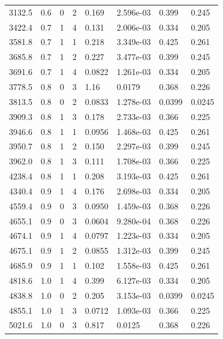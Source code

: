 \documentclass[preview]{standalone}
\begin{document}
{{{\begin{tabular}{L{1.2cm}C{1.2cm} C{0.3cm}C{0.5cm} C{1.4cm}C{1.4cm} C{1.4cm}C{1.4cm}}
  3132.5  &   0.6  & 0     &  2 &  0.169  & 2.596e-03  & 0.399 &  0.245   \\ 
  3422.4  &   0.7  & 1     &  4 &  0.131  & 2.006e-03  & 0.334 &  0.205   \\ 
  3581.8  &   0.7  & 1     &  1 &  0.218  & 3.349e-03  & 0.425 &  0.261   \\ 
  3685.8  &   0.7  & 1     &  2 &  0.227  & 3.477e-03  & 0.399 &  0.245   \\ 
  3691.6  &   0.7  & 1     &  4 &  0.0822  & 1.261e-03  & 0.334 &  0.205   \\ 
  3778.5  &   0.8  & 0     &  3 &  1.16  & 0.0179  & 0.368 &  0.226   \\ 
  3813.5  &   0.8  & 0     &  2 &  0.0833  & 1.278e-03  & 0.0399 &  0.0245   \\ 
  3909.3  &   0.8  & 1     &  3 &  0.178  & 2.733e-03  & 0.366 &  0.225   \\ 
  3946.6  &   0.8  & 1     &  1 &  0.0956  & 1.468e-03  & 0.425 &  0.261   \\ 
  3950.7  &   0.8  & 1     &  2 &  0.150  & 2.297e-03  & 0.399 &  0.245   \\ 
  3962.0  &   0.8  & 1     &  3 &  0.111  & 1.708e-03  & 0.366 &  0.225   \\ 
  4238.4  &   0.8  & 1     &  1 &  0.208  & 3.193e-03  & 0.425 &  0.261   \\ 
  4340.4  &   0.9  & 1     &  4 &  0.176  & 2.698e-03  & 0.334 &  0.205   \\ 
  4559.4  &   0.9  & 0     &  3 &  0.0950  & 1.459e-03  & 0.368 &  0.226   \\ 
  4655.1  &   0.9  & 0     &  3 &  0.0604  & 9.280e-04  & 0.368 &  0.226   \\ 
  4674.1  &   0.9  & 1     &  4 &  0.0797  & 1.223e-03  & 0.334 &  0.205   \\ 
  4675.1  &   0.9  & 1     &  2 &  0.0855  & 1.312e-03  & 0.399 &  0.245   \\ 
  4685.9  &   0.9  & 1     &  1 &  0.102  & 1.558e-03  & 0.425 &  0.261   \\ 
  4818.6  &   1.0  & 1     &  4 &  0.399  & 6.127e-03  & 0.334 &  0.205   \\ 
  4838.8  &   1.0  & 0     &  2 &  0.205  & 3.153e-03  & 0.0399 &  0.0245   \\ 
  4855.1  &   1.0  & 1     &  3 &  0.0712  & 1.093e-03  & 0.366 &  0.225   \\ 
  5021.6  &   1.0  & 0     &  3 &  0.817  & 0.0125  & 0.368 &  0.226   \\ 

\end{tabular}}}}
\end{document}
